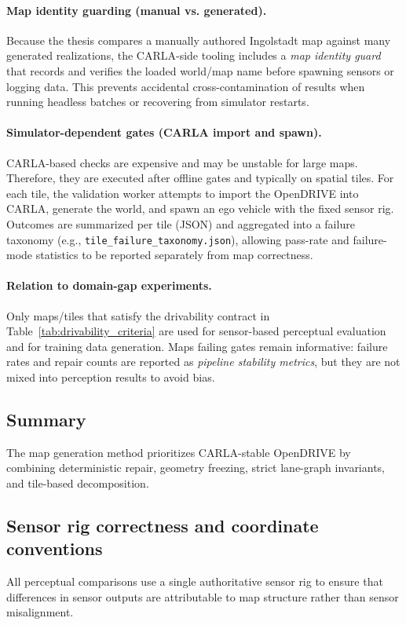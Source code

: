 \paragraph{Map identity guarding (manual vs. generated).}
Because the thesis compares a manually authored Ingolstadt map against many generated realizations, the CARLA-side tooling includes a \emph{map identity guard} that records and verifies the loaded world/map name before spawning sensors or logging data.
This prevents accidental cross-contamination of results when running headless batches or recovering from simulator restarts.

\paragraph{Simulator-dependent gates (CARLA import and spawn).}
CARLA-based checks are expensive and may be unstable for large maps.
Therefore, they are executed after offline gates and typically on spatial tiles.
For each tile, the validation worker attempts to import the OpenDRIVE into CARLA, generate the world, and spawn an ego vehicle with the fixed sensor rig.
Outcomes are summarized per tile (JSON) and aggregated into a failure taxonomy (e.g., \texttt{tile\_failure\_taxonomy.json}), allowing pass-rate and failure-mode statistics to be reported separately from map correctness.

\paragraph{Relation to domain-gap experiments.}
Only maps/tiles that satisfy the drivability contract in Table~\ref{tab:drivability_criteria} are used for sensor-based perceptual evaluation and for training data generation.
Maps failing gates remain informative: failure rates and repair counts are reported as \emph{pipeline stability metrics}, but they are not mixed into perception results to avoid bias.


\subsection{Summary}
The map generation method prioritizes CARLA-stable OpenDRIVE by combining deterministic repair, geometry freezing, strict lane-graph invariants, and tile-based decomposition.


\subsection{Sensor rig correctness and coordinate conventions}
\label{sec:sensor_rig}
All perceptual comparisons use a single authoritative sensor rig to ensure that differences in sensor outputs are attributable to map structure rather than sensor misalignment.

